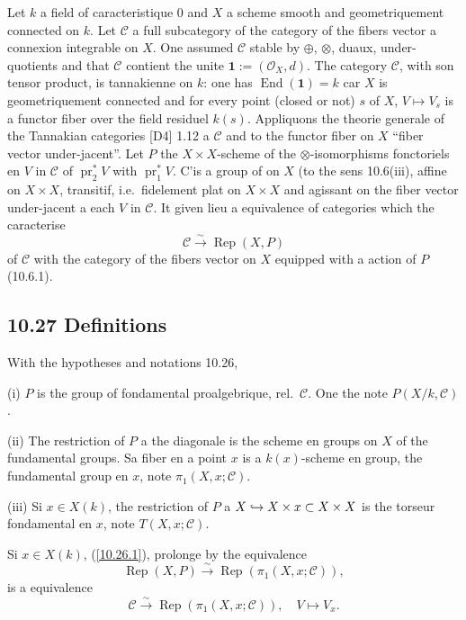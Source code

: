 \documentclass[12pt,a4paper]{article}
\theoremstyle{plain}
\theoremstyle{definition}
\theoremstyle{remark}
\DeclareMathOperator{\End}{End}
\DeclareMathOperator{\pr}{pr}
\DeclareMathOperator{\Rep}{Rep}
\begin{document}
Let $k$ a field of caracteristique 0 and $X$ a scheme smooth and geometriquement connected on $k$. Let $\mathcal{C}$ a full subcategory of the category of the fibers vector a connexion integrable on $X$. One assumed $\mathcal{C}$ stable by $\oplus$, $\otimes$, duaux, under-quotients and that $\mathcal{C}$ contient the unite $\mathbf{1} := (\mathcal{O}_X, d)$. The category $\mathcal{C}$, with son tensor product, is tannakienne on $k$: one has $\End(\mathbf{1}) = k$ car $X$ is geometriquement connected and for every point (closed or not) $s$ of $X$, $V \mapsto V_s$ is a functor fiber over the field residuel $k(s)$. Appliquons the theorie generale of the Tannakian categories [D4] 1.12 a $\mathcal{C}$ and to the functor fiber on $X$ ``fiber vector under-jacent''. Let $P$ the $X \times X$-scheme of the $\otimes$-isomorphisms fonctoriels en $V$ in $\mathcal{C}$ of $\pr_2^* V$ with $\pr_1^* V$. C'is a group of on $X$ (to the sens 10.6(iii), affine on $X \times X$, transitif, i.e.~fidelement plat on $X \times X$ and agissant on the fiber vector under-jacent a each $V$ in $\mathcal{C}$. It given lieu a equivalence of categories which the caracterise
\begin{equation}\label{10.26.1}
\mathcal{C} \xrightarrow{\sim} \Rep(X, P) \tag{10.26.1}
\end{equation}
of $\mathcal{C}$ with the category of the fibers vector on $X$ equipped with a action of $P$ (10.6.1).

\subsection*{10.27 Definitions}

With the hypotheses and notations 10.26,

(i) $P$ is the group of fondamental proalgebrique, rel.~$\mathcal{C}$. One the note $P(X/k, \mathcal{C})$.

(ii) The restriction of $P$ a the diagonale is the scheme en groups on $X$ of the fundamental groups. Sa fiber en a point $x$ is a $k(x)$-scheme en group, the fundamental group en $x$, note $\pi_1(X, x; \mathcal{C})$.

(iii) Si $x \in X(k)$, the restriction of $P$ a $X \hookrightarrow X \times \\{x\\} \subset X \times X$ is the torseur fondamental en $x$, note $T(X, x; \mathcal{C})$.

Si $x \in X(k)$, (\ref{10.26.1}), prolonge by the equivalence
\begin{equation}\label{10.27.1}
\Rep(X, P) \xrightarrow{\sim} \Rep(\pi_1(X, x; \mathcal{C})), \tag{10.27.1}
\end{equation}
is a equivalence
\begin{equation}\label{10.27.2}
\mathcal{C} \xrightarrow{\sim} \Rep(\pi_1(X, x; \mathcal{C})), \quad V \mapsto V_x. \tag{10.27.2}
\end{equation}
\end{document}
